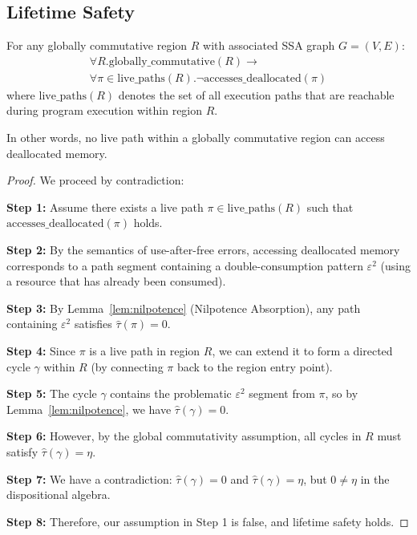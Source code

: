\documentclass[journal]{IEEEtran}
\begin{document}
\subsection{Lifetime Safety}

\begin{theorem}  
For any globally commutative region $R$ with associated SSA graph $G = (V, E)$:
\begin{multline}
\forall R. \text{globally\_commutative}(R) \rightarrow \\
\forall \pi \in \text{live\_paths}(R). \neg \text{accesses\_deallocated}(\pi)
\end{multline}
where $\text{live\_paths}(R)$ denotes the set of all execution paths that are reachable during program execution within region $R$.

In other words, no live path within a globally commutative region can access deallocated memory.
\end{theorem}

\begin{proof}
We proceed by contradiction:

\textbf{Step 1:} Assume there exists a live path $\pi \in \text{live\_paths}(R)$ such that $\text{accesses\_deallocated}(\pi)$ holds.

\textbf{Step 2:} By the semantics of use-after-free errors, accessing deallocated memory corresponds to a path segment containing a double-consumption pattern $\varepsilon^2$ (using a resource that has already been consumed).

\textbf{Step 3:} By Lemma~\ref{lem:nilpotence} (Nilpotence Absorption), any path containing $\varepsilon^2$ satisfies $\hat{\tau}(\pi) = 0$.

\textbf{Step 4:} Since $\pi$ is a live path in region $R$, we can extend it to form a directed cycle $\gamma$ within $R$ (by connecting $\pi$ back to the region entry point).

\textbf{Step 5:} The cycle $\gamma$ contains the problematic $\varepsilon^2$ segment from $\pi$, so by Lemma~\ref{lem:nilpotence}, we have $\hat{\tau}(\gamma) = 0$.

\textbf{Step 6:} However, by the global commutativity assumption, all cycles in $R$ must satisfy $\hat{\tau}(\gamma) = \eta$.

\textbf{Step 7:} We have a contradiction: $\hat{\tau}(\gamma) = 0$ and $\hat{\tau}(\gamma) = \eta$, but $0 \neq \eta$ in the dispositional algebra.

\textbf{Step 8:} Therefore, our assumption in Step 1 is false, and lifetime safety holds. 
\end{proof}
\end{document}
